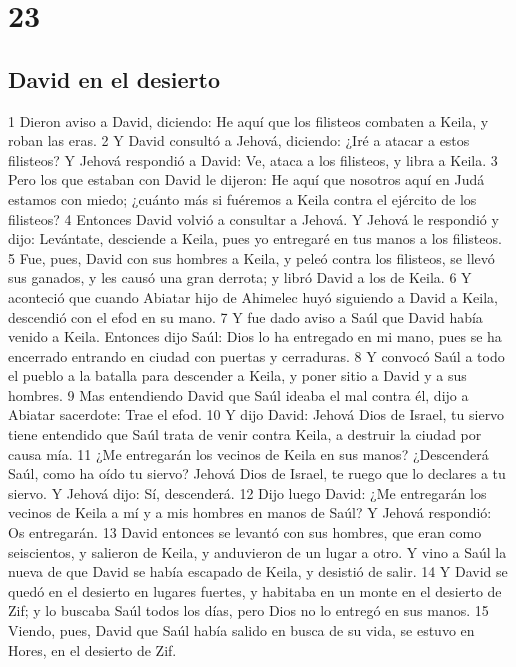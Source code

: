 \chapter{23}

\section*{David en el desierto}


1 Dieron aviso a David, diciendo: He aquí que los filisteos combaten a Keila, y roban las eras.
2 Y David consultó a Jehová, diciendo: ¿Iré a atacar a estos filisteos? Y Jehová respondió a David: Ve, ataca a los filisteos, y libra a Keila.
3 Pero los que estaban con David le dijeron: He aquí que nosotros aquí en Judá estamos con miedo; ¿cuánto más si fuéremos a Keila contra el ejército de los filisteos?
4 Entonces David volvió a consultar a Jehová. Y Jehová le respondió y dijo: Levántate, desciende a Keila, pues yo entregaré en tus manos a los filisteos.
5 Fue, pues, David con sus hombres a Keila, y peleó contra los filisteos, se llevó sus ganados, y les causó una gran derrota; y libró David a los de Keila.
6 Y aconteció que cuando Abiatar hijo de Ahimelec huyó siguiendo a David a Keila, descendió con el efod en su mano.
7 Y fue dado aviso a Saúl que David había venido a Keila. Entonces dijo Saúl: Dios lo ha entregado en mi mano, pues se ha encerrado entrando en ciudad con puertas y cerraduras.
8 Y convocó Saúl a todo el pueblo a la batalla para descender a Keila, y poner sitio a David y a sus hombres.
9 Mas entendiendo David que Saúl ideaba el mal contra él, dijo a Abiatar sacerdote: Trae el efod.
10 Y dijo David: Jehová Dios de Israel, tu siervo tiene entendido que Saúl trata de venir contra Keila, a destruir la ciudad por causa mía.
11 ¿Me entregarán los vecinos de Keila en sus manos? ¿Descenderá Saúl, como ha oído tu siervo? Jehová Dios de Israel, te ruego que lo declares a tu siervo. Y Jehová dijo: Sí, descenderá.
12 Dijo luego David: ¿Me entregarán los vecinos de Keila a mí y a mis hombres en manos de Saúl? Y Jehová respondió: Os entregarán.
13 David entonces se levantó con sus hombres, que eran como seiscientos, y salieron de Keila, y anduvieron de un lugar a otro. Y vino a Saúl la nueva de que David se había escapado de Keila, y desistió de salir.
14 Y David se quedó en el desierto en lugares fuertes, y habitaba en un monte en el desierto de Zif; y lo buscaba Saúl todos los días, pero Dios no lo entregó en sus manos.
15 Viendo, pues, David que Saúl había salido en busca de su vida, se estuvo en Hores, en el desierto de Zif.
